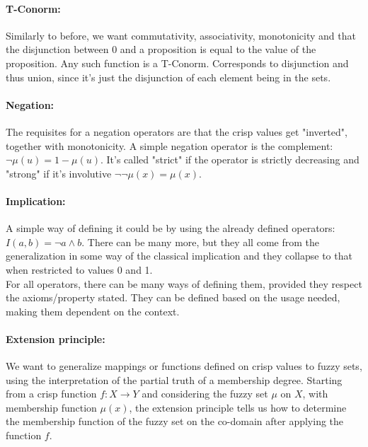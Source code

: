 \paragraph{T-Conorm:} Similarly to before, we want commutativity, associativity, monotonicity and that the disjunction between 0 and a proposition is equal to the value of the proposition. Any such function is a T-Conorm. Corresponds to disjunction and thus union, since it's just the disjunction of each element being in the sets.\\

\paragraph{Negation:} The requisites for a negation operators are that the crisp values get "inverted", together with monotonicity. A simple negation operator is the complement: $\neg \mu(u) = 1 - \mu(u)$. It's called "strict" if the operator is strictly decreasing and "strong" if it's involutive $\neg \neg \mu(x) = \mu(x)$.\\

\paragraph{Implication:} A simple way of defining it could be by using the already defined operators: $I(a,b) = \neg a \wedge b$. There can be many more, but they all come from the generalization in some way of the classical implication and they collapse to that when restricted to values 0 and 1.\\

For all operators, there can be many ways of defining them, provided they respect the axioms/property stated. They can be defined based on the usage needed, making them dependent on the context.\\

\paragraph{Extension principle:} We want to generalize mappings or functions defined on crisp values to fuzzy sets, using the interpretation of the partial truth of a membership degree. Starting from a crisp function $f: X \rightarrow Y$ and considering the fuzzy set $\mu$ on $X$, with membership function $\mu(x)$, the extension principle tells us how to determine the membership function of the fuzzy set on the co-domain after applying the function $f$.\\

